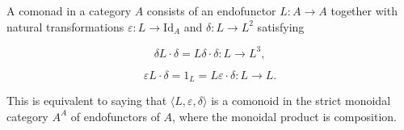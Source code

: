 A comonad in a category $A$ consists of an endofunctor $L : A \rightarrow A$ together with natural transformations $\varepsilon : L \rightarrow \mathrm{Id}_A$ and $\delta : L \rightarrow L^2$ satisfying

$$\delta L \cdot \delta = L \delta \cdot \delta : L \rightarrow L^3,$$

$$\varepsilon L \cdot \delta = 1_L = L \varepsilon \cdot \delta : L \rightarrow L.$$

This is equivalent to saying that $\langle L, \varepsilon, \delta \rangle$ is a comonoid in the strict monoidal category $A^A$ of endofunctors of $A$, where the monoidal product is composition.
